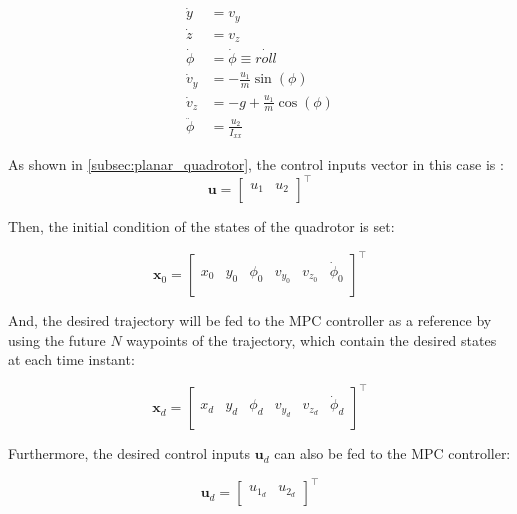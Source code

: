 \documentclass{thesisreport}
\begin{document}
			\begin{align}
                \dot{y} &= v_y \\
                \dot{z} &= v_z \\
                \dot{\phi} &= \dot{\phi} \equiv \dot{roll} \\
                \dot{v}_y &= - \frac{u_1}{m} \sin(\phi) \\
                \dot{v}_z &= - g + \frac{u_1}{m} \cos(\phi) \\
                \ddot{\phi} &= \frac{u_2}{I_{xx}}
            \end{align}   

As shown in \ref{subsec:planar_quadrotor}, the control inputs vector in this case is :
	\begin{equation}
	\bm{u} = \begin{bmatrix}
		u_1 & u_2 \\
	\end{bmatrix}^{\intercal}
	\end{equation}

Then, the initial condition of the states of the quadrotor is set: 

\begin{equation}
	\bm{x}_0 = \begin{bmatrix}
	x_0 & y_0 & \phi_0 & v_{y_0} & v_{z_0} & \dot{\phi}_0 \\
	\end{bmatrix}^{\intercal}
\end{equation} 

And, the desired trajectory will be fed to the MPC controller as a reference by using the future $N$ waypoints of the trajectory, which contain the desired states at each time instant:

\begin{equation}
	\bm{x}_d = \begin{bmatrix}
		x_d & y_d & \phi_d & v_{y_d} & v_{z_d} & \dot{\phi}_d \\
\end{bmatrix}^{\intercal}	 
\end{equation}

Furthermore, the desired control inputs $\bm{u}_d$ can also be fed to the MPC controller:


\begin{equation}
	\bm{u}_d = \begin{bmatrix}
		u_{1_d} & u_{2_d} \\
	\end{bmatrix}^{\intercal}
\end{equation}
\end{document}
